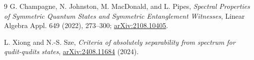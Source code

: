 \documentclass[10pt]{article}
\begin{document}
\begin{thebibliography}{9}
G. Champagne, N. Johnston, M. MacDonald, and L. Pipes,
\emph{Spectral Properties of Symmetric Quantum States and Symmetric
Entanglement Witnesses}, Linear Algebra Appl. 649 (2022), 273--300;
\href{https://arxiv.org/abs/2108.10405}{arXiv:2108.10405}.

L. Xiong and N.-S. Sze,
\emph{Criteria of absolutely separability from spectrum for qudit-qudits
states}, \href{https://arxiv.org/abs/2408.11684}{arXiv:2408.11684} (2024).
\end{thebibliography}
\end{document}
